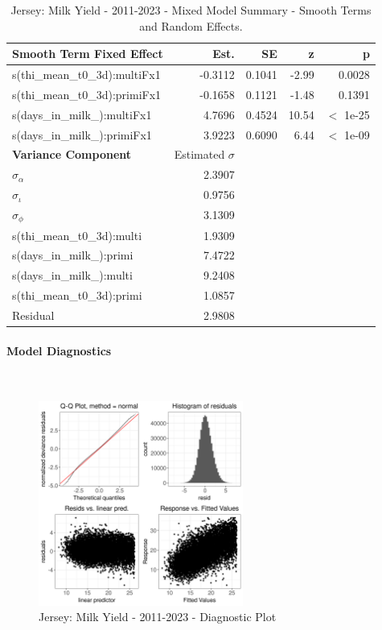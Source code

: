 \newpage
\begin{table}[H]
\centering
\begin{tabular}
{l | r | r | r | r}
\textbf{Smooth Term Fixed Effect} & Est. & SE & z & p\\
\hline
\hline
s(thi\_mean\_t0\_3d):multiFx1& -0.3112 & 0.1041 & -2.99 & 0.0028\\
s(thi\_mean\_t0\_3d):primiFx1 & -0.1658 & 0.1121 & -1.48 & 0.1391\\
s(days\_in\_milk\_):multiFx1 & 4.7696 & 0.4524 & 10.54 & $<$ 1e-25\\
s(days\_in\_milk\_):primiFx1 & 3.9223 & 0.6090 & 6.44 & $<$ 1e-09\\
\hline
\textbf{Variance Component} & Estimated $\sigma$ & & & \\
\hline
\hline
$\sigma_\alpha$ & 2.3907 & &  & \\
$\sigma_\iota$ & 0.9756 & & & \\
$\sigma_\phi$ & 3.1309 & & & \\
s(thi\_mean\_t0\_3d):multi & 1.9309 & & & \\
s(days\_in\_milk\_):primi & 7.4722 & & & \\
s(days\_in\_milk\_):multi & 9.2408 & & & \\
s(thi\_mean\_t0\_3d):primi & 1.0857 & & & \\
Residual & 2.9808 & & & \\
\end{tabular}
\caption[]{Jersey: Milk Yield - 2011-2023 - Mixed Model Summary - Smooth Terms and Random Effects.}
\end{table}

\paragraph{Model Diagnostics} \quad \\
\begin{figure}[H]
    \centering
    \includegraphics[width=0.6\textwidth]{thesis/figures/models/milk/after2010/je_milk_after2010/je_milk_after2010_diagnostics.png}
    \caption[]{Jersey: Milk Yield - 2011-2023 - Diagnostic Plot}
\end{figure}

